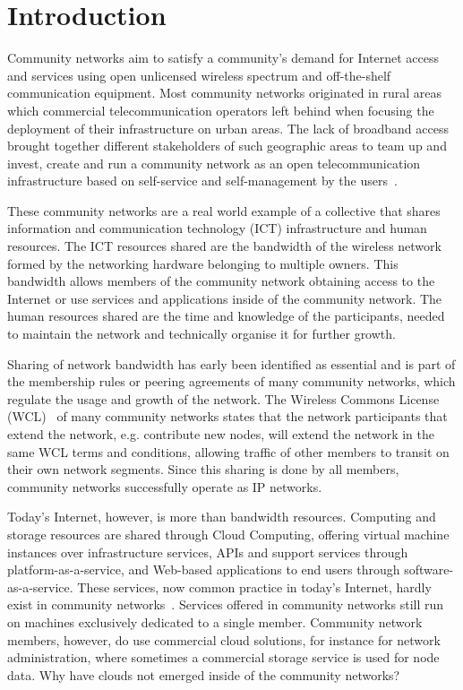 
\section{Introduction}
\label{sec:introduction}

Community networks aim to satisfy a community's demand for Internet access and services using open unlicensed wireless spectrum and off-the-shelf communication equipment. 
Most community networks originated in rural areas which commercial telecommunication operators left behind when focusing the deployment of their infrastructure on urban areas. 
The lack of broadband access brought together different stakeholders of such geographic areas to team up and invest, create and run a community network as an open telecommunication infrastructure based on self-service and self-management by the users~\cite{Elianos2009}.

These community networks are a real world example of a collective that shares information and communication technology (ICT) infrastructure and human resources. 
The ICT resources shared are the bandwidth of the wireless network formed by the networking hardware belonging to multiple owners. 
This bandwidth allows members of the community network obtaining access to the Internet or use services and applications inside of the community network.
The human resources shared are the time and knowledge of the participants, needed to maintain the network and technically organise it for further growth. 

Sharing of network bandwidth has early been identified as essential and is part of the membership rules or peering agreements of many community networks, which regulate the usage and growth of the network. 
The Wireless Commons License (WCL)~\cite{WCL2012} of many community networks states that the network participants that extend the network, e.g. contribute new nodes, will extend the network in the same WCL terms and conditions, allowing traffic of other members to transit on their own network segments. Since this sharing is done by all members, community networks successfully operate as IP networks. 

Today's Internet, however, is more than bandwidth resources. 
Computing and storage resources are shared through Cloud Computing, offering virtual machine instances over infrastructure services, APIs and support services through platform-as-a-service, and Web-based applications to end users through software-as-a-service. 
These services, now common practice in today's Internet, hardly exist in community networks~\cite{Khan2013Clouds}. 
Services offered in community networks still run on machines exclusively dedicated to a single member. 
Community network members, however, do use commercial cloud solutions, for instance for network administration, where sometimes a commercial storage service is used for node data. 
Why have clouds not emerged inside of the community networks?

